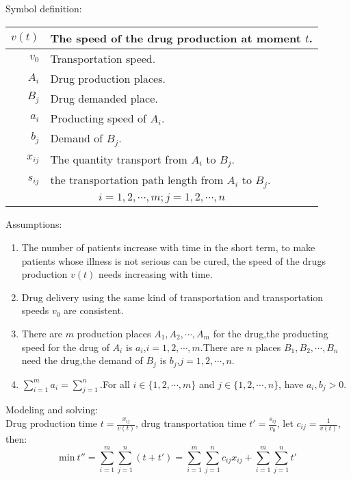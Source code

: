 Symbol definition:
\begin{center}
\begin{tabular}{|r|p{8cm}|}
\hline
$ v(t) $ & The speed of the drug production at moment $t$.\\
\hline
$ v_0 $ & Transportation speed.\\
\hline
$ A_i $ & Drug production places.\\
\hline
$ B_j $ & Drug demanded place.\\
\hline
$ a_i $ & Producting speed of $A_i$.\\
\hline
$ b_j $ & Demand of $ B_j $.\\
\hline
$ x_{ij} $ & The quantity transport from $ A_i $ to
$ B_j $.\\
\hline
$ s_{ij} $ & the transportation path length from $A_i$ to $B_j$.\\
\hline
\multicolumn{2}{|c|}{$ i=1,2,\cdots,m;j=1,2,\cdots,n $}\\
\hline
\end{tabular}
\end{center}%
Assumptions:
\begin{enumerate}
  \item The number of patients increase with time in the short
term, to make patients whose illness is not serious can be
cured, the speed of the drugs production $ v(t) $ needs
increasing with time.
  \item Drug delivery using the same kind of transportation and
transportation speeds $ v_0 $ are consistent.
  \item There are $ m $ production places $ A_1,A_2,\cdots,A_m $
for the drug,the producting speed for the drug of $ A_i $ is
$ a_i $,$ i=1,2,\cdots,m $.There are $ n $ places $
B_1,B_2,\cdots,B_n $ need the drug,the demand of $ B_j $ is
$ b_j $,$ j=1,2,\cdots,n $.
  \item $ \sum_{i=1}^{m}a_i=\sum_{j=1}^{n} $.For all
$ i\in\{1,2,\cdots,m\} $ and $ j\in\{1,2,\cdots,n\} $, have
$ a_i,b_j>0 $.
\end{enumerate}
Modeling and solving:\\
Drug production time $ t=\frac{x_{ij}}{v(t)} $, drug
transportation time $ t'=\frac{s_{ij}}{v_0} $, let
$ c_{ij}=\frac{1}{v(t)} $, then:\\
\begin{equation}
\mathrm{min}~t''=\sum_{i=1}^{m}\sum_{j=1}^{n}(t+t')=
\sum_{i=1}^{m}\sum_{j=1}^{n}c_{ij}x_{ij} + 
\sum_{i=1}^{m}\sum_{j=1}^{n}t'
\label{equ:31}
\end{equation}
